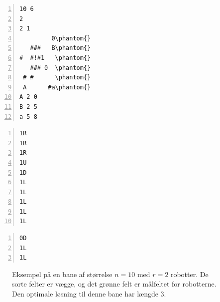 \documentclass[10pt, a4paper]{article}
\begin{document}
\newsavebox{\simpleboard}
\begin{lrbox}\simpleboard%
\hspace{1cm}
\begin{minipage}[b]{2.1cm}%
\begin{Verbatim}[frame=single, numbers=left, showspaces, commandchars=\\\{\}, baselinestretch=0.64]
10 6
2
2 1
         0\phantom{}
   ###   B\phantom{}
#  #!#1   \phantom{}
   ### 0  \phantom{}
 # #      \phantom{}
 A      #a\phantom{}
A 2 0
B 2 5
a 5 8
\end{Verbatim}
\end{minipage} 
\hspace{1cm}
\end{lrbox}

\newsavebox{\simpleboardsolution}
\begin{lrbox}\simpleboardsolution%
\hspace{1cm}
\begin{minipage}[b]{2.1cm}%
\begin{Verbatim}[frame=single, numbers=left,showspaces, commandchars=\\\{\}, baselinestretch=0.64, label={\scriptsize Løsning 1}]
1R
1R
1R
1U
1D
1L
1L
1L
1L
1L
\end{Verbatim}
\vspace{-4pt}
\begin{Verbatim}[frame=single, numbers=left,showspaces, commandchars=\\\{\}, baselinestretch=0.64, label={\scriptsize Løsning 2}]
0D
1L
1L
\end{Verbatim}
\end{minipage}
\hspace{1cm}
\end{lrbox}

\begin{figure}
\centering
{}
\hspace{0.2cm}
\hspace{0.2cm}
\caption{Eksempel på en bane af størrelse $n=10$ med $r=2$ robotter. De sorte felter er vægge, og det grønne felt er målfeltet for robotterne. Den optimale løsning til denne bane har længde 3.}
\label{fig:simpleboardexample}
\end{figure}
\end{document}
